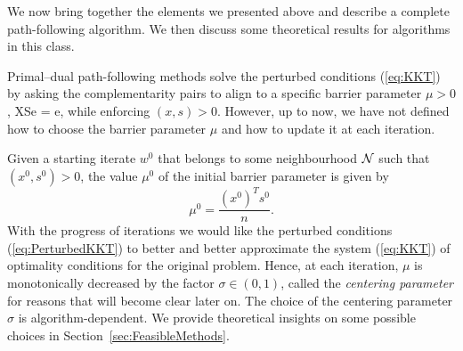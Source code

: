 We now bring together the elements we presented above and describe
a complete path-following algorithm. We then discuss some
theoretical results for algorithms in this class.

Primal--dual path-following methods solve the perturbed \KKT
conditions (\ref{eq:KKT}) by asking the complementarity pairs to align 
to a specific barrier parameter $\mu > 0$,
\be  \label{eq:PerturbedComplementarity}
XSe = \mu e,
\ee
while enforcing $(x,s)>0$.
However, up to now, we have not defined how to choose the
barrier parameter $\mu$ and how to update it at each iteration.

Given a starting iterate $w^0$ that belongs to some neighbourhood $\mathcal{N}$
such that $(x^0, s^0) > 0$, the value $\mu^0$ 
of the initial barrier parameter is given by
\[
   \mu^0 = \frac{(x^0)^T s^0}{n}.
\]
With the progress of iterations 
we would like the perturbed \KKT conditions (\ref{eq:PerturbedKKT}) 
to better and better approximate
the system (\ref{eq:KKT}) of optimality conditions for the original
problem.
Hence, at each iteration, $\mu$ is monotonically decreased by the factor
$\sigma \in (0,1)$, called the {\em centering parameter} for reasons that
will become clear later on.
The choice of the centering parameter $\sigma$ 
is algorithm-dependent. We provide theoretical insights on some
possible choices in Section~\ref{sec:FeasibleMethods}.



